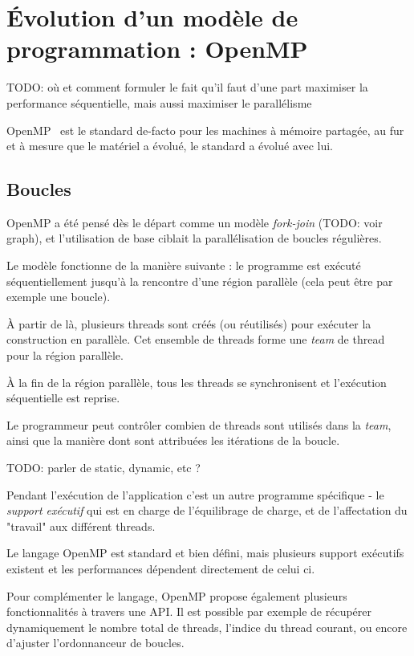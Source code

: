 \section{Évolution d'un modèle de programmation : OpenMP}\label{sec:context:openmp}

TODO: où et comment formuler le fait qu'il faut d'une part maximiser la performance séquentielle, mais aussi maximiser le parallélisme

OpenMP~\cite{openmp40} est le standard de-facto pour les machines à mémoire partagée, au fur et à mesure que le matériel a évolué, le standard a évolué avec lui.

\subsection{Boucles}

OpenMP a été pensé dès le départ comme un modèle \emph{fork-join} (TODO: voir graph), et l'utilisation de base ciblait la parallélisation de boucles régulières.

Le modèle fonctionne de la manière suivante : le programme est exécuté séquentiellement jusqu'à la rencontre d'une région parallèle (cela peut être par exemple une boucle).

À partir de là, plusieurs threads sont créés (ou réutilisés) pour exécuter la construction en parallèle. Cet ensemble de threads forme une \emph{team} de thread pour la région parallèle.

À la fin de la région parallèle, tous les threads se synchronisent et l'exécution séquentielle est reprise.

Le programmeur peut contrôler combien de threads sont utilisés dans la \emph{team}, ainsi que la manière dont sont attribuées les itérations de la boucle.

TODO: parler de static, dynamic, etc ?

Pendant l'exécution de l'application c'est un autre programme spécifique - le \emph{support exécutif} qui est en charge de l'équilibrage de charge, et de l'affectation du "travail" aux différent threads.

Le langage OpenMP est standard et bien défini, mais plusieurs support exécutifs existent et les performances dépendent directement de celui ci.

Pour complémenter le langage, OpenMP propose également plusieurs fonctionnalités à travers une API. Il est possible par exemple de récupérer dynamiquement le nombre total de threads, l'indice du thread courant, ou encore d'ajuster l'ordonnanceur de boucles.

